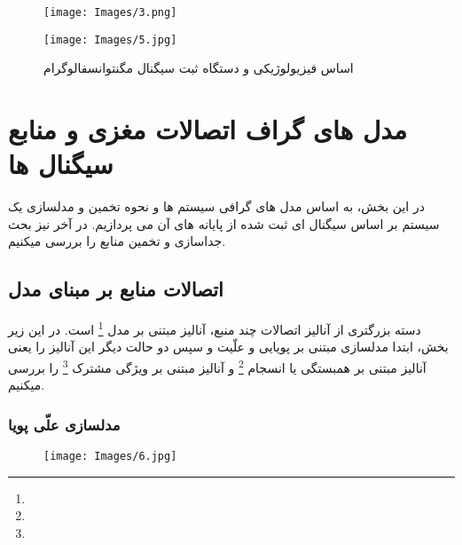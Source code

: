 \documentclass[11pt]{extarticle}
\begin{document}
\begin{figure}[h!]
	\centering
 	\texttt{[image: Images/3.png]}
 
	\texttt{[image: Images/5.jpg]}
	\caption{اساس فیزیولوژیکی و دستگاه ثبت سیگنال مگنتوانسفالوگرام}
	\label{fig:9}
\end{figure}
 

\clearpage
\newpage
\section{مدل های گراف اتصالات مغزی و منابع سیگنال ها}
در این بخش، به اساس مدل های گرافی سیستم ها و نحوه تخمین و مدلسازی یک سیستم بر اساس سیگنال ای ثبت شده از پایانه های آن می پردازیم. در آخر نیز بحث جداسازی و تخمین منابع را بررسی میکنیم.

\subsection{اتصالات منابع بر مبنای مدل}

دسته بزرگتری از آنالیز اتصالات چند منبع، آنالیز مبتنی بر مدل
\footnote{}
است. در این زیر بخش، ابتدا مدلسازی مبتنی بر پویایی و علّیت و سپس دو حالت دیگر این آنالیز را یعنی آنالیز مبتنی بر همبستگی یا انسجام
\footnote{}
و آنالیز مبتنی بر ویژگی مشترک
\footnote{}
را بررسی میکنیم. 

\subsubsection{مدلسازی علّی پویا}

\begin{figure}[hb!]
	\centering
	\texttt{[image: Images/6.jpg]}
	\caption{}
	\label{fig:10}
\end{figure}
\end{document}
